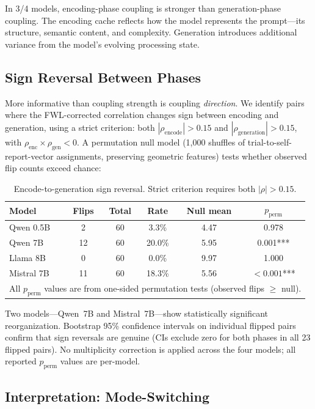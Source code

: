 \documentclass[11pt,a4paper]{article}
\begin{document}
In 3/4 models, encoding-phase coupling is stronger than generation-phase
coupling. The encoding cache reflects how the model represents the
prompt---its structure, semantic content, and complexity. Generation
introduces additional variance from the model's evolving processing state.

\subsection{Sign Reversal Between Phases}

More informative than coupling strength is coupling \emph{direction}. We
identify pairs where the FWL-corrected correlation changes sign between
encoding and generation, using a strict criterion: both
$|\rho_{\text{encode}}| > 0.15$ and $|\rho_{\text{generation}}| > 0.15$,
with $\rho_{\text{enc}} \times \rho_{\text{gen}} < 0$. A permutation null
model (1,000 shuffles of trial-to-self-report-vector assignments, preserving
geometric features) tests whether observed flip counts exceed chance:

\begin{table}[H]
\centering
\caption{Encode-to-generation sign reversal. Strict criterion requires both $|\rho| > 0.15$.}
\label{tab:sign_reversal}
\begin{tabular}{lccccc}
\toprule
\textbf{Model} & \textbf{Flips} & \textbf{Total} & \textbf{Rate} & \textbf{Null mean} & \textbf{$p_{\text{perm}}$} \\
\midrule
Qwen 0.5B  & 2  & 60 & 3.3\%  & 4.47 & 0.978 \\
Qwen 7B    & 12 & 60 & 20.0\% & 5.95 & 0.001*** \\
Llama 8B   & 0  & 60 & 0.0\%  & 9.97 & 1.000 \\
Mistral 7B & 11 & 60 & 18.3\% & 5.56 & ${<}0.001$*** \\
\bottomrule
\multicolumn{6}{l}{\footnotesize All $p_{\text{perm}}$ values are from one-sided permutation tests (observed flips $\geq$ null).}
\end{tabular}
\end{table}

Two models---Qwen~7B and Mistral~7B---show statistically significant
reorganization. Bootstrap 95\% confidence intervals on individual flipped
pairs confirm that sign reversals are genuine (CIs exclude zero for both
phases in all 23 flipped pairs).
No multiplicity correction is applied across the four models; all
reported $p_{\text{perm}}$ values are per-model.

\subsection{Interpretation: Mode-Switching}
\end{document}
